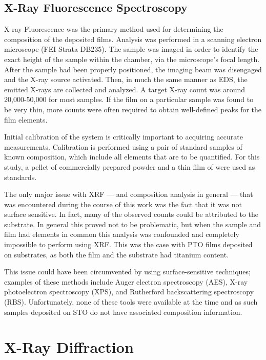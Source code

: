 \lipsum


\subsection{X-Ray Fluorescence Spectroscopy}

X-ray Fluorescence was the primary method used for determining the composition of the deposited films. Analysis was performed in a scanning electron microscope (FEI Strata DB235). The sample was imaged in order to identify the exact height of the sample within the chamber, via the microscope's focal length. After the sample had been properly positioned, the imaging beam was disengaged and the X-ray source activated. Then, in much the same manner as EDS, the emitted X-rays are collected and analyzed. A target X-ray count was around 20,000-50,000 for most samples. If the film on a particular sample was found to be very thin, more counts were often required to obtain well-defined peaks for the film elements. 

Initial calibration of the system is critically important to acquiring accurate measurements. Calibration is performed using a pair of standard samples of known composition, which include all elements that are to be quantified. For this study, a pellet of commercially prepared \PTO{} powder and a thin film of  were used as standards. 

The only major issue with XRF --- and composition analysis in general --- that was encountered during the course of this work was the fact that it was not surface sensitive. In fact, many of the observed counts could be attributed to the substrate. In general this proved not to be problematic, but when the sample and film had elements in common this analysis was confounded and completely impossible to perform using XRF. This was the case with PTO films deposited on  substrates, as both the film and the substrate had titanium content. 

This issue could have been circumvented by using surface-sensitive techniques; examples of these methods include Auger electron spectroscopy (AES), X-ray photoelectron spectroscopy (XPS), and Rutherford backscattering spectroscopy (RBS). Unfortunately, none of these tools were available at the time and as such samples deposited on STO do not have associated composition information. 


\section{X-Ray Diffraction}
\label{sec:Methods-XRD}




%





